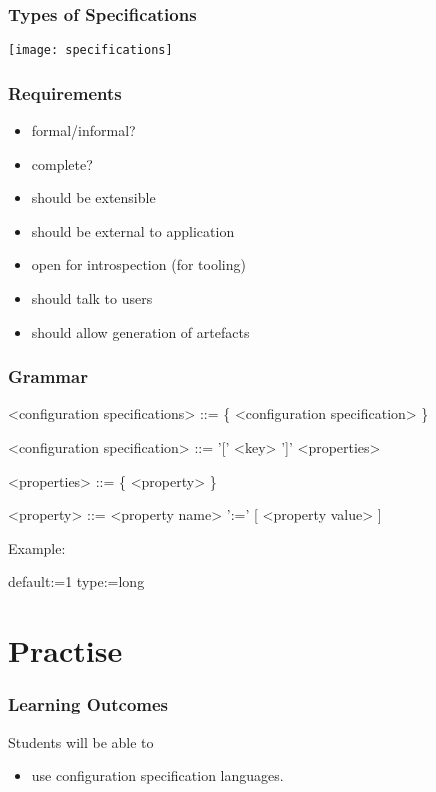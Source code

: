 \begin{frame}
	\frametitle{Types of Specifications}
	\texttt{[image: specifications]}
\end{frame}


\begin{frame}
	\frametitle{Requirements}

	\begin{itemize}
	\item formal/informal?
	\item complete?
	\pause
	\item should be extensible
	\item should be external to application
	\item open for introspection (for tooling)
	\item should talk to users
	\item should allow generation of artefacts
	\end{itemize}
\end{frame}


\begin{frame}[fragile]
	\frametitle{Grammar}
	\begin{grammar}
	<configuration specifications> ::= \{ <configuration specification> \}

	<configuration specification> ::= '[' <key> ']' <properties>

	<properties> ::= \{ <property> \}

	<property> ::= <property name> ':=' [ <property value> ]
	\end{grammar}

	\vspace{1cm}
	Example:
	\begin{code}
	default:=1
	type:=long
	\end{code}
\end{frame}


\section{Practise}

\begin{frame}
	\frametitle{Learning Outcomes}
	Students will be able to
	\begin{itemize}
	\item use configuration specification languages.
	\end{itemize}
\end{frame}

